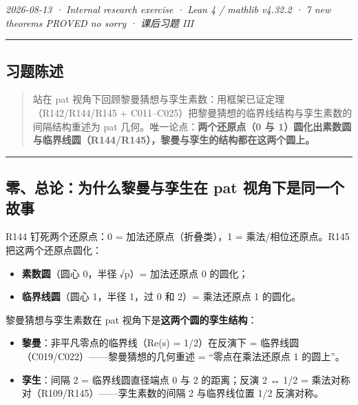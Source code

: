 \documentclass[
]{article}
\providecommand{\tightlist}{%
 \setlength{\itemsep}{0pt}\setlength{\parskip}{0pt}}
\begin{document}
\emph{2026-08-13 · Internal research exercise · Lean 4 / mathlib v4.32.2
· 7 new theorems PROVED no sorry · 课后习题 III }

\begin{center}\rule{0.5\linewidth}{0.5pt}\end{center}

\subsection{习题陈述}\label{ux4e60ux9898ux9648ux8ff0}

\begin{quote}
站在 pat 视角下回顾黎曼猜想与孪生素数：用框架已证定理（R142/R144/R145
+ C011--C025）把黎曼猜想的临界线结构与孪生素数的间隔结构重述为 pat
几何。唯一论点：\textbf{两个还原点（0 与
1）圆化出素数圆与临界线圆（R144/R145），黎曼与孪生的结构都在这两个圆上。}
\end{quote}

\begin{center}\rule{0.5\linewidth}{0.5pt}\end{center}

\subsection{零、总论：为什么黎曼与孪生在 pat
视角下是同一个故事}\label{ux96f6ux603bux8bbaux4e3aux4ec0ux4e48ux9eceux66fcux4e0eux5b6aux751fux5728-pat-ux89c6ux89d2ux4e0bux662fux540cux4e00ux4e2aux6545ux4e8b}

 R144 钉死两个还原点：0 = 加法还原点（折叠类），1 =
乘法/相位还原点。R145 把这两个还原点圆化：

\begin{itemize}
\tightlist
\item
 \textbf{素数圆}（圆心 0，半径 √p）= 加法还原点 0 的圆化；
\item
 \textbf{临界线圆}（圆心 1，半径 1，过 0 和 2）= 乘法还原点 1 的圆化。
\end{itemize}

黎曼猜想与孪生素数在 pat 视角下是\textbf{这两个圆的孪生结构}：

\begin{itemize}
\tightlist
\item
 \textbf{黎曼}：非平凡零点的临界线（Re(s) = 1/2）在反演下 =
 临界线圆（C019/C022）------黎曼猜想的几何重述 = ``零点在乘法还原点 1
 的圆上''。
\item
 \textbf{孪生}：间隔 2 = 临界线圆直径端点 0 与 2 的距离；反演 2 ↔ 1/2 =
 乘法对称对（R109/R145）------孪生素数的间隔 2 与临界线位置 1/2
 反演对称。
\end{itemize}
\end{document}
